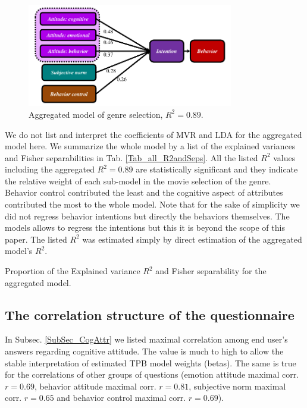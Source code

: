 \documentclass{llncs}
\begin{document}
 \begin{figure}[h!]
 \begin{center}
   \includegraphics[width=9cm]{TpbTopH.pdf}
   \caption[Fig_AggregModel]{Aggregated  model of genre selection, $R^2=0.89$.}
   \label{Fig_AggregModel}
 \end{center}
 \end{figure}

We do not list and interpret the coefficients of MVR and LDA for the aggregated model here. We summarize the whole model by a list of the explained variances and Fisher separabilities in Tab. \ref{Tab_all_R2andSeps}. All the listed $R^2$ values including the aggregated $R^2=0.89$ are statistically significant and they indicate the relative weight of each sub-model in the movie selection of the genre. Behavior control contributed the least and the cognitive aspect of attributes contributed the most to the whole model. Note that for the sake of simplicity we did not regress behavior intentions but directly the behaviors themselves. The models allows to regress the intentions but this it is beyond the scope of this paper. The listed $R^2$ was estimated simply by direct estimation of the aggregated model's $R^2$.

\begin{table}[!h]
  \centering
   
  \caption{Proportion of the Explained variance $R^2$ and Fisher separability for the aggregated model.}
  \label{Tab_all_R2andSeps}
\end{table}


\subsection{The correlation structure of the questionnaire}\label{SubSec_CorrStruct}
In Subsec. \ref{SubSec_CogAttr} we listed maximal correlation among end user's answers regarding cognitive attitude. The value is much to high to allow the stable interpretation of estimated TPB model weights (betas). The same is true for the correlations of other groups of questions (emotion attitude maximal corr. $r=0.69$, behavior attitude maximal corr. $r=0.81$, subjective norm maximal corr. $r=0.65$ and behavior control maximal corr. $r=0.69$).
\end{document}
